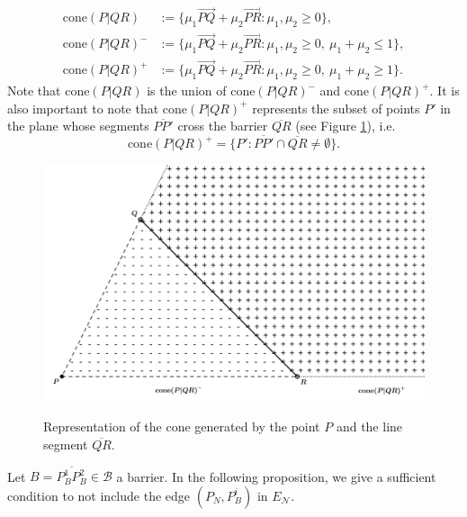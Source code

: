 \documentclass[a4paper,  review, authoryear, 1p., doubleblind]{elsarticle}
\newcommand{\EN}{{E^{}_{\mathcal N}}}
\newcommand{\segment}[2]{\overline{#1#2}}
\begin{document}
	\begin{align*}
		\text{cone}(P|QR)&:=\{\mu_1 \overrightarrow{PQ}+\mu_2\overrightarrow{PR}:\mu_1,\mu_2\geq 0\},\\
		\text{cone}(P|QR)^-&:=\{\mu_1 \overrightarrow{PQ}+\mu_2\overrightarrow{PR}:\mu_1,\mu_2\geq 0,\:\mu_1+\mu_2\leq 1\},\\
		\text{cone}(P|QR)^+&:=\{\mu_1 \overrightarrow{PQ}+\mu_2\overrightarrow{PR}:\mu_1,\mu_2\geq 0,\:\mu_1+\mu_2\geq 1\}.
	\end{align*}
	Note that $\text{cone}(P|QR)$ is the union of $\text{cone}(P|QR)^-$ and $\text{cone}(P|QR)^+$. It is also important to note that $\text{cone}(P|QR)^+$ represents the subset of points $P'$ in the plane whose segments $\segment{P}{P'}$ cross the barrier $\overline{QR}$ (see Figure \ref{fig:cones}), i.e.
	$$\text{cone}(P|QR)^+=\{P':\overline{PP'}\cap\overline{QR}\neq\emptyset\}.$$
	
	\begin{figure}[h!]
		\caption{Representation of the cone generated by the point $P$ and the line segment $\segment{Q}{R}$.}
		\centering
		\includegraphics[width=0.75\linewidth]{figures/cones}
		\label{fig:cones}
	\end{figure}
	Let $B = \overline{P^1_BP^2_B}\in\mathcal B$ a barrier. In the following proposition, we give a sufficient condition to not include the edge $(P^{}_N, P^i_B)$ in $\EN$.
	
\end{document}
